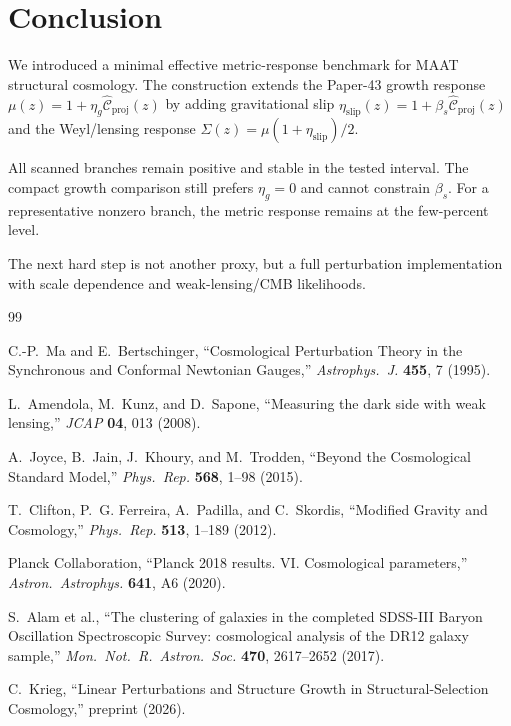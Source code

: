 \documentclass[11pt,a4paper]{article}
\newcommand{\Chatproj}{\widehat{\mathcal{C}}_{\mathrm{proj}}}
\newcommand{\etaslip}{\eta_{\mathrm{slip}}}
\begin{document}
\section{Conclusion}

We introduced a minimal effective metric-response benchmark for MAAT
structural cosmology.
The construction extends the Paper-43 growth response
$\mu(z)=1+\eta_g\Chatproj(z)$ by adding gravitational slip
$\etaslip(z)=1+\beta_s\Chatproj(z)$ and the Weyl/lensing response
$\Sigma(z)=\mu(1+\etaslip)/2$.

All scanned branches remain positive and stable in the tested interval.
The compact growth comparison still prefers $\eta_g=0$ and cannot constrain
$\beta_s$.
For a representative nonzero branch, the metric response remains at the
few-percent level.

The next hard step is not another proxy, but a full perturbation implementation
with scale dependence and weak-lensing/CMB likelihoods.

\begin{thebibliography}{99}

C.-P.~Ma and E.~Bertschinger,
``Cosmological Perturbation Theory in the Synchronous and Conformal Newtonian
Gauges,''
\emph{Astrophys.\ J.} \textbf{455}, 7 (1995).

L.~Amendola, M.~Kunz, and D.~Sapone,
``Measuring the dark side with weak lensing,''
\emph{JCAP} \textbf{04}, 013 (2008).

A.~Joyce, B.~Jain, J.~Khoury, and M.~Trodden,
``Beyond the Cosmological Standard Model,''
\emph{Phys.\ Rep.} \textbf{568}, 1--98 (2015).

T.~Clifton, P.~G. Ferreira, A.~Padilla, and C.~Skordis,
``Modified Gravity and Cosmology,''
\emph{Phys.\ Rep.} \textbf{513}, 1--189 (2012).

Planck Collaboration,
``Planck 2018 results. VI. Cosmological parameters,''
\emph{Astron.\ Astrophys.} \textbf{641}, A6 (2020).

S.~Alam et al.,
``The clustering of galaxies in the completed SDSS-III Baryon Oscillation
Spectroscopic Survey: cosmological analysis of the DR12 galaxy sample,''
\emph{Mon.\ Not.\ R.\ Astron.\ Soc.} \textbf{470}, 2617--2652 (2017).

C.~Krieg,
``Linear Perturbations and Structure Growth in Structural-Selection
Cosmology,''
preprint (2026).

\end{thebibliography}
\end{document}

